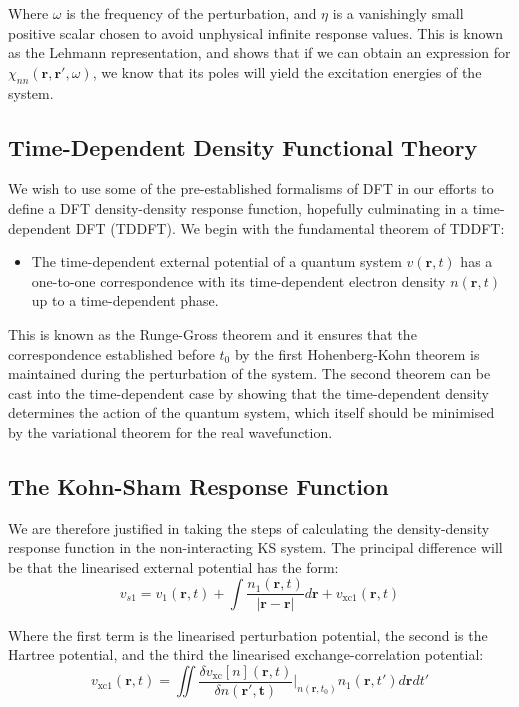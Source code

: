 Where $\omega$ is the frequency of the perturbation, and $\eta$ is a vanishingly small positive scalar chosen to avoid unphysical infinite response values. This is known as the Lehmann representation, and shows that if we can obtain an expression for $\chi_{nn}(\bm{r},\bm{r}',\omega)$, we know that its poles will yield the excitation energies of the system.

\subsection{Time-Dependent Density Functional Theory}

We wish to use some of the pre-established formalisms of DFT in our efforts to define a DFT density-density response function, hopefully culminating in a time-dependent DFT (TDDFT). We begin with the fundamental theorem of TDDFT:

\begin{itemize}
    \item The time-dependent external potential of a quantum system $v(\bm{r},t)$ has a one-to-one correspondence with its time-dependent electron density $n(\bm{r},t)$ up to a time-dependent phase.
\end{itemize}
This is known as the Runge-Gross theorem and it ensures that the correspondence established before $t_0$ by the first Hohenberg-Kohn theorem is maintained during the perturbation of the system. The second theorem can be cast into the time-dependent case by showing that the time-dependent density determines the action of the quantum system, which itself should be minimised by the variational theorem for the real wavefunction.

\subsection{The Kohn-Sham Response Function}
We are therefore justified in taking the steps of calculating the density-density response function in the non-interacting KS system. The principal difference will be that the linearised external potential has the form:
\begin{equation}
    v_{s1} = v_1(\bm{r},t) + \int \frac{n_1(\bm{r},t)}{|\bm{r}-\bm{r}|}d\bm{r} + v_{\text{xc}1}(\bm{r},t)
\end{equation}

Where the first term is the linearised perturbation potential, the second is the Hartree potential, and the third the linearised exchange-correlation potential:
\begin{equation}
    v_{\text{xc}1}(\bm{r},t) = \iint \frac{\delta v_{\text{xc}}[n](\bm{r},t)}{\delta n(\bm{r',t})} \Bigr|_{n(\bm{r},t_0)} n_1(\bm{r},t') d\bm{r} dt'
\end{equation}

